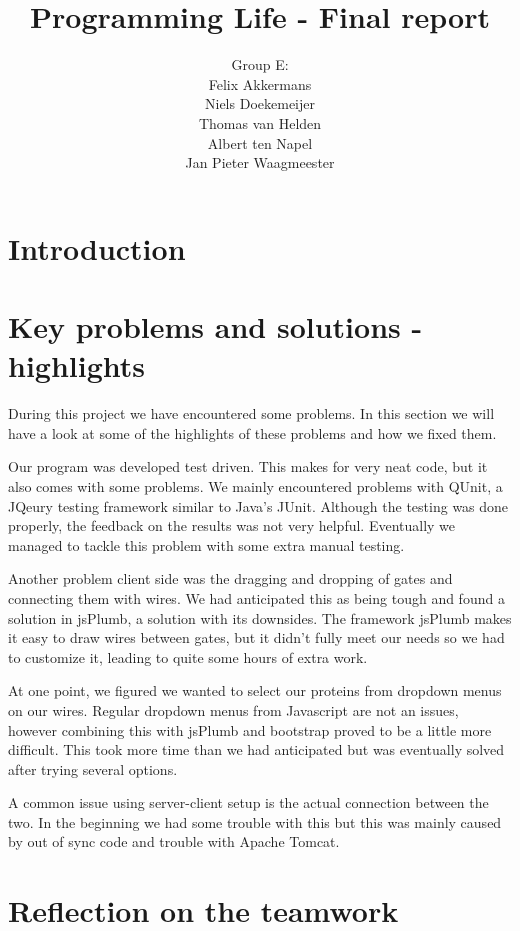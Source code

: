 \documentclass[a4paper]{article}
\title{Programming Life - Final report}
\author{Group E:\\
Felix Akkermans \\
Niels Doekemeijer \\
Thomas van Helden \\
Albert ten Napel \\
Jan Pieter Waagmeester}
\begin{document}
\maketitle

\vfill

\small{\tableofcontents}
\pagebreak



\section{Introduction}


\section{Key problems and solutions - highlights}

During this project we have encountered some problems. In this section we will have a look at some of the highlights of these problems and how we fixed them.

Our program was developed test driven. This makes for very neat code, but it also comes with some problems. We mainly encountered problems with QUnit, a JQeury testing framework similar to Java's JUnit. Although the testing was done properly, the feedback on the results was not very helpful. Eventually we managed to tackle this problem with some extra manual testing.

Another problem client side was the dragging and dropping of gates and connecting them with wires. We had anticipated this as being tough and found a solution in jsPlumb, a solution with its downsides. The framework jsPlumb makes it easy to draw wires between gates, but it didn't fully meet our needs so we had to customize it, leading to quite some hours of extra work.

At one point, we figured we wanted to select our proteins from dropdown menus on our wires. Regular dropdown menus from Javascript are not an issues, however combining this with jsPlumb and bootstrap proved to be a little more difficult. This took more time than we had anticipated but was eventually solved after trying several options.

A common issue using server-client setup is the actual connection between the two. In the beginning we had some trouble with this but this was mainly caused by out of sync code and trouble with Apache Tomcat.



\section{Reflection on the teamwork}
\end{document}
